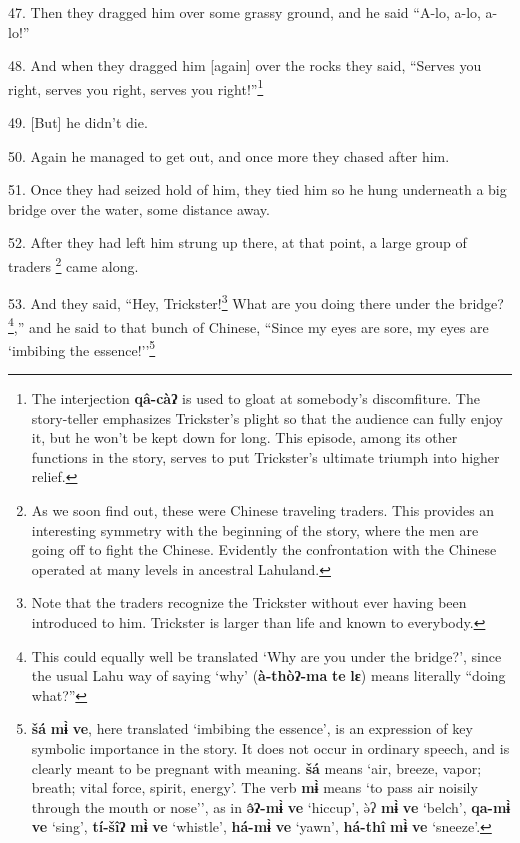 47. Then they dragged him over some grassy ground, and he said ``A-lo, a-lo, a-lo!''

48. And when they dragged him [again] over the rocks they said, ``Serves you right,
serves you right, serves you right!''\footnote{The interjection \textbf{qâ-càʔ} is used to gloat at somebody's discomfiture. The story-teller emphasizes Trickster's plight so that the audience can fully enjoy it, but he won't be kept down for long. This episode, among its other functions in the story, serves to put Trickster's ultimate triumph into higher relief.}

49. [But] he didn't die.

50. Again he managed to get out, and once more they chased after him.

51. Once they had seized hold of him, they tied him so he hung underneath a big
bridge over the water, some distance away.

52. After they had left him strung up there, at that point, a large group of traders
\footnote{As we soon find out, these were Chinese traveling traders. This provides an interesting symmetry with the beginning of the story, where the men are going off to fight the Chinese. Evidently the confrontation with the Chinese operated at many levels in ancestral Lahuland.} came along.

53. And they said, ``Hey, Trickster!\footnote{Note that the traders recognize the Trickster without ever having been introduced to him. Trickster is larger than life and known to everybody.} What are you doing there under the bridge?
\footnote{This could equally well be translated `Why are you under the bridge?', since the usual Lahu way of saying `why' (\textbf{à-thòʔ-ma} \textbf{te} \textbf{lɛ}) means literally ``doing what?''},'' and he said to that bunch of Chinese, ``Since my eyes are sore, my eyes
are `imbibing the essence!''\footnote{\textbf{šá} \textbf{mɨ̀} \textbf{ve}, here translated `imbibing the essence', is an expression of key symbolic importance in the story. It does not occur in ordinary speech, and is clearly meant to be pregnant with meaning. \textbf{šá} means `air, breeze, vapor; breath; vital force, spirit, energy'. The verb \textbf{mɨ̀} means `to pass air noisily through the mouth or nose'', as in \textbf{ə̂ʔ-mɨ̀} \textbf{ve} `hiccup', ə̀ʔ \textbf{mɨ̀} \textbf{ve} `belch', \textbf{qa-mɨ̀} \textbf{ve} `sing', \textbf{tí-šîʔ} \textbf{mɨ̀} \textbf{ve} `whistle', \textbf{há-mɨ̀} \textbf{ve} `yawn', \textbf{há-thî} \textbf{mɨ̀} \textbf{ve} `sneeze'.}

